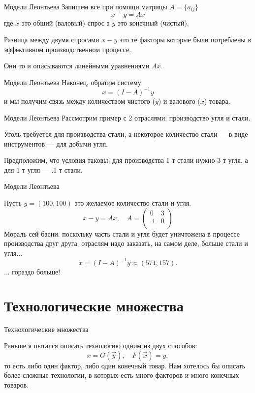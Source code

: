 \documentclass{beamer}
\begin{document}
\begin{frame}{Модели Леонтьева}
Запишем все при помощи матрицы $A = \{a_{ij}\}$
  $$x - y = Ax$$
где $x$ это общий (валовый) спрос а $y$ это конечный (чистый). 

Разница между двумя спросами $x - y$ это те факторы которые были потреблены в эффективном производственном процессе. 

Они то и описываются линейными уравнениями $Ax$.
\end{frame}

\begin{frame}{Модели Леонтьева}
Наконец, обратим систему
  $$x = (I-A)^{-1} y$$
и мы получим связь между количеством чистого ($y$) и валового ($x$) товара.

\end{frame}

\begin{frame}{Модели Леонтьева}
Рассмотрим пример с 2 отраслями: производство угля и стали.

Уголь требуется для производства стали, а некоторое количество стали — в виде инструментов — для добычи угля. 

Предположим, что условия таковы: для производства 1 т стали нужно 3 т угля, а для 1 т угля — .1 т стали.

\end{frame}

\begin{frame}{Модели Леонтьева}

Пусть $y = (100, 100)$ это желаемое количество стали и угля.
$$
x - y = A x, \quad A =\begin{pmatrix}
  0 & 3\\
  .1 & 0\\
\end{pmatrix}
$$
Мораль сей басни: поскольку часть стали и угля будет уничтожена в процессе производства друг друга, отраслям надо заказать, на самом деле, больше стали и угля...
$$
x = (I - A)^{-1} y \approx (571, 157).
$$
... гораздо больше!

\end{frame}

\section{Технологические множества}

\begin{frame}{Технологические множества}

Раньше я пытался описать технологию одним из двух способов:
$$ x = G(\vec y), \quad F(\vec x) = y,$$
то есть либо один фактор, либо один конечный товар. Нам хотелось бы описать более сложные технологии, в которых есть много факторов и много конечных товаров.

\end{frame}
\end{document}
